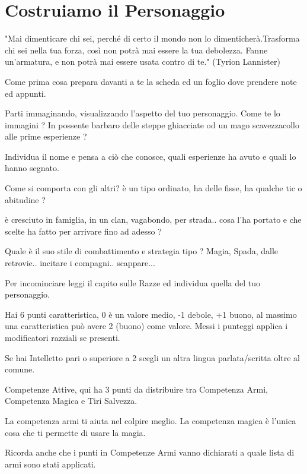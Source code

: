 \documentclass[a4paper,11pt,twoside,openany]{book}
\begin{document}
\pagebreak

\section{Costruiamo il Personaggio}

\label{costruiamo-il-personaggio}
\begin{tcolorbox}[enhanced,arc=5pt,boxrule=0.3pt]{
		"Mai dimenticare chi sei, perché di certo il mondo non lo dimenticherà.Trasforma chi sei nella tua forza, così non potrà mai essere la tua debolezza. Fanne un'armatura, e non potrà mai essere usata contro di te." (Tyrion Lannister)
	}\end{tcolorbox}\medskip

Come prima cosa prepara davanti a te la scheda ed un foglio dove prendere note ed appunti.

Parti immaginando, visualizzando l'aspetto del tuo personaggio. Come te lo immagini ? In possente barbaro delle steppe ghiacciate od un mago scavezzacollo alle prime esperienze ?

Individua il nome e pensa a ciò che conosce, quali esperienze ha avuto e quali lo hanno segnato.

Come si comporta con gli altri? è un tipo ordinato, ha delle fisse, ha qualche tic o abitudine ?

è cresciuto in famiglia, in un clan, vagabondo, per strada.. cosa l'ha portato e che scelte ha fatto per arrivare fino ad adesso ?

Quale è il suo stile di combattimento e strategia tipo ? Magia, Spada, dalle retrovie.. incitare i compagni.. scappare...

Per incominciare leggi il capito sulle Razze ed individua quella del tuo personaggio.

Hai 6 punti caratteristica, 0 è un valore medio, -1 debole, +1 buono, al massimo una caratteristica può avere 2 (buono) come valore. Messi i punteggi applica i modificatori razziali se presenti.

Se hai Intelletto pari o superiore a 2 scegli un altra lingua parlata/scritta oltre al comune.

Competenze Attive, qui ha 3 punti da distribuire tra Competenza Armi, Competenza Magica e Tiri Salvezza.

La competenza armi ti aiuta nel colpire meglio. La competenza magica è l'unica cosa che ti permette di usare la magia.

Ricorda anche che i punti in Competenze Armi vanno dichiarati a quale lista di armi sono stati applicati.
\end{document}
